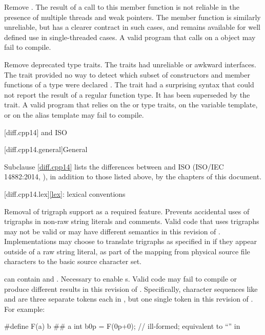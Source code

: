 \nodiffref
\change
Remove .
\rationale
The result of a call to this member function is not reliable in the presence of
multiple threads and weak pointers. The member function  is
similarly unreliable, but has a clearer contract in such cases, and remains
available for well defined use in single-threaded cases.
\effect
A valid \CppXVII{} program that calls  on a 
object may fail to compile.

\change
Remove deprecated type traits.
\rationale
The traits had unreliable or awkward interfaces. The 
trait provided no way to detect which subset of constructors and member
functions of a type were declared . The 
trait had a surprising syntax that could not report the result of a regular
function type. It has been superseded by the  trait.
\effect
A valid \CppXVII{} program that relies on the  or
 type traits, on the  variable template,
or on the  alias template may fail to compile.

[diff.cpp14]{\Cpp{} and ISO \CppXIV{}}

[diff.cpp14.general]{General}

\pnum
{}%
Subclause \ref{diff.cpp14} lists the differences between \Cpp{} and
ISO \CppXIV{} (ISO/IEC 14882:2014, ),
in addition to those listed above,
by the chapters of this document.

[diff.cpp14.lex]{\ref{lex}: lexical conventions}

%
\change
Removal of trigraph support as a required feature.
\rationale
Prevents accidental uses of trigraphs in non-raw string literals and comments.
\effect
Valid \CppXIV{} code that uses trigraphs may not be valid or may have different
semantics in this revision of \Cpp{}. Implementations may choose to
translate trigraphs as specified in \CppXIV{} if they appear outside of a raw
string literal, as part of the  mapping from physical source file characters to
the basic source character set.

\change
{} can contain   and
 .
\rationale
Necessary to enable s.
\effect
Valid \CppXIV{} code may fail to compile or produce different results in
this revision of \Cpp{}. Specifically, character sequences like 
and  are three separate tokens each in \CppXIV{}, but one single token
in this revision of \Cpp{}.
For example:
\begin{codeblock}
#define F(a) b ## a
int b0p = F(0p+0);  // ill-formed; equivalent to ``\!'' in \CppXIV{}
\end{codeblock}

